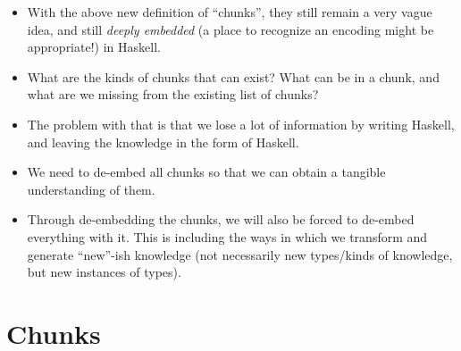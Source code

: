 \begin{itemize}

      \item With the above new definition of ``chunks'', they still remain a
            very vague idea, and still \textit{deeply embedded} (a place to
            recognize an encoding might be appropriate!) in Haskell.

      \item What are the kinds of chunks that can exist? What can be in a chunk,
            and what are we missing from the existing list of chunks?

      \item The problem with that is that we lose a lot of information by
            writing Haskell, and leaving the knowledge in the form of Haskell.

      \item We need to de-embed all chunks so that we can obtain a tangible
            understanding of them.

      \item Through de-embedding the chunks, we will also be forced to de-embed
            everything with it. This is including the ways in which we transform
            and generate ``new''-ish knowledge (not necessarily new types/kinds
            of knowledge, but new instances of types).

\end{itemize}

\section{Chunks}

